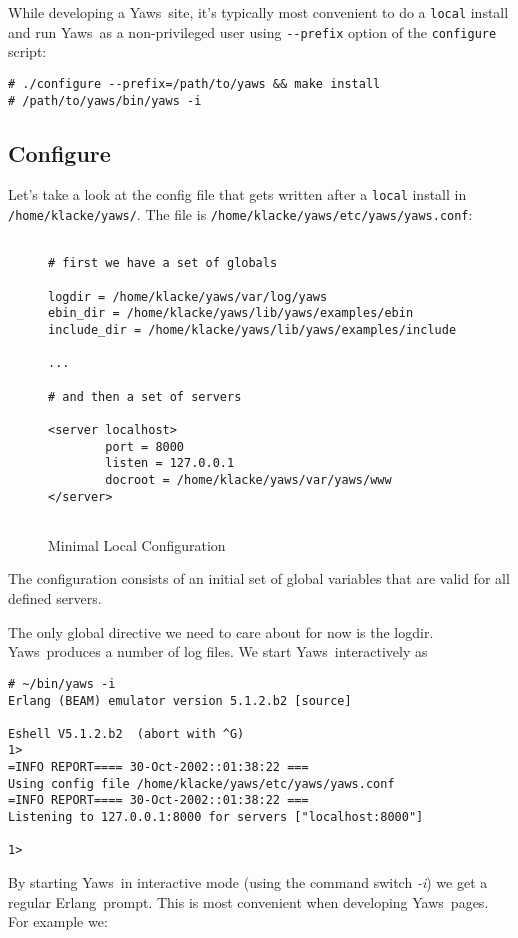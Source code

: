 \documentclass[11pt,oneside,english]{book}
\newcommand{\Erlang}            %
        {{\sc Erlang}}
\newcommand{\Yaws}            %
        {{\sc Yaws}}
\begin{document}
While developing a \Yaws\ site, it's typically most convenient to do a
\verb+local+ install and run \Yaws\ as a non-privileged user using
\verb+--prefix+ option of the \verb+configure+ script:
\begin{verbatim}
# ./configure --prefix=/path/to/yaws && make install
# /path/to/yaws/bin/yaws -i
\end{verbatim}

\subsection{Configure}
Let's take a look at the config file that gets written after a \verb+local+
install in \verb+/home/klacke/yaws/+. The file is
\verb+/home/klacke/yaws/etc/yaws/yaws.conf+:


\begin{figure}[h]
\begin{verbatim}

# first we have a set of globals

logdir = /home/klacke/yaws/var/log/yaws
ebin_dir = /home/klacke/yaws/lib/yaws/examples/ebin
include_dir = /home/klacke/yaws/lib/yaws/examples/include

...

# and then a set of servers

<server localhost>
        port = 8000
        listen = 127.0.0.1
        docroot = /home/klacke/yaws/var/yaws/www
</server>


\end{verbatim}
\caption{Minimal Local Configuration}
\end{figure}

The configuration consists of an initial set of global
variables that are valid for all defined servers.

The only global directive we need to care about for now is the logdir.
\Yaws\ produces a number of log files. We start \Yaws\ interactively as

\begin{verbatim}
# ~/bin/yaws -i
Erlang (BEAM) emulator version 5.1.2.b2 [source]

Eshell V5.1.2.b2  (abort with ^G)
1>
=INFO REPORT==== 30-Oct-2002::01:38:22 ===
Using config file /home/klacke/yaws/etc/yaws/yaws.conf
=INFO REPORT==== 30-Oct-2002::01:38:22 ===
Listening to 127.0.0.1:8000 for servers ["localhost:8000"]

1>
\end{verbatim}

By starting \Yaws\ in interactive mode (using the command switch
\textit{-i}) we get a regular \Erlang\ prompt. This is most convenient
when developing \Yaws\ pages. For example we:
\end{document}
